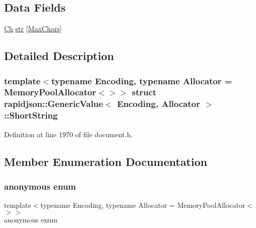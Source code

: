 \subsection*{Data Fields}
\begin{DoxyCompactItemize}
\item 
\mbox{\hyperlink{classrapidjson_1_1_generic_value_adcdbc7fa85a9a41b78966d7e0dcc2ac4}{Ch}} \mbox{\hyperlink{structrapidjson_1_1_generic_value_1_1_short_string_af01f91b1cd1ed9a53a7dc2eb9022c1e0}{str}} \mbox{[}\mbox{\hyperlink{structrapidjson_1_1_generic_value_1_1_short_string_a77aa02281a84b131e4d4eb3a13146815a78cfea23edd64c3767922023807ced64}{Max\+Chars}}\mbox{]}
\end{DoxyCompactItemize}


\subsection{Detailed Description}
\subsubsection*{template$<$typename Encoding, typename Allocator = Memory\+Pool\+Allocator$<$$>$$>$\newline
struct rapidjson\+::\+Generic\+Value$<$ Encoding, Allocator $>$\+::\+Short\+String}



Definition at line 1970 of file document.\+h.



\subsection{Member Enumeration Documentation}
\mbox{\label{structrapidjson_1_1_generic_value_1_1_short_string_a77aa02281a84b131e4d4eb3a13146815}} 
\subsubsection{\texorpdfstring{anonymous enum}{anonymous enum}}
{\footnotesize\ttfamily template$<$typename Encoding, typename Allocator = Memory\+Pool\+Allocator$<$$>$$>$ \\
anonymous enum}

